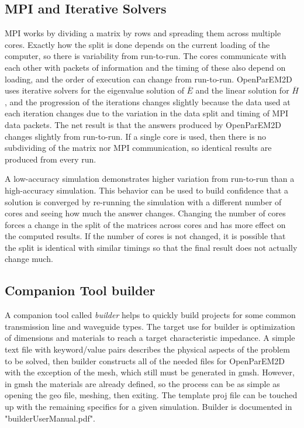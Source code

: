 \documentclass[titlepage]{article}
\renewcommand\_{\textunderscore\linebreak[1]}
\begin{document}
\subsection{MPI and Iterative Solvers}

MPI works by dividing a matrix by rows and spreading them across multiple cores.  Exactly how the split is done depends on the current loading of the computer, so there is variability from run-to-run.  The cores communicate with each other with packets of information and the timing of these also depend on loading, and the order of execution can change from run-to-run.  OpenParEM2D uses iterative solvers for the eigenvalue solution of $\overline{E}$ and the linear solution for $\overline{H}$, and the progression of the iterations changes slightly because the data used at each iteration changes due to the variation in the data split and timing of MPI data packets.  The net result is that the answers produced by OpenParEM2D changes slightly from run-to-run.  If a single core is used, then there is no subdividing of the matrix nor MPI communication, so identical results are produced from every run.

A low-accuracy simulation demonstrates higher variation from run-to-run than a high-accuracy simulation.  This behavior can be used to build confidence that a solution is converged by re-running the simulation with a different number of cores and seeing how much the answer changes.  Changing the number of cores forces a change in the split of the matrices across cores and has more effect on the computed results.  If the number of cores is not changed, it is possible that the split is identical with similar timings so that the final result does not actually change much.

\subsection{Companion Tool builder}

A companion tool called \textit{builder} helps to quickly build projects for some common transmission line and waveguide types.  The target use for builder is optimization of dimensions and materials to reach a target characteristic impedance.  A simple text file with keyword/value pairs describes the physical aspects of the problem to be solved, then builder constructs all of the needed files for OpenParEM2D with the exception of the mesh, which still must be generated in gmsh.  However, in gmsh the materials are already defined, so the process can be as simple as opening the geo file, meshing, then exiting.  The template proj file can be touched up with the remaining specifics for a given simulation.  Builder is documented in "builder\_User\_Manual.pdf".
\end{document}
